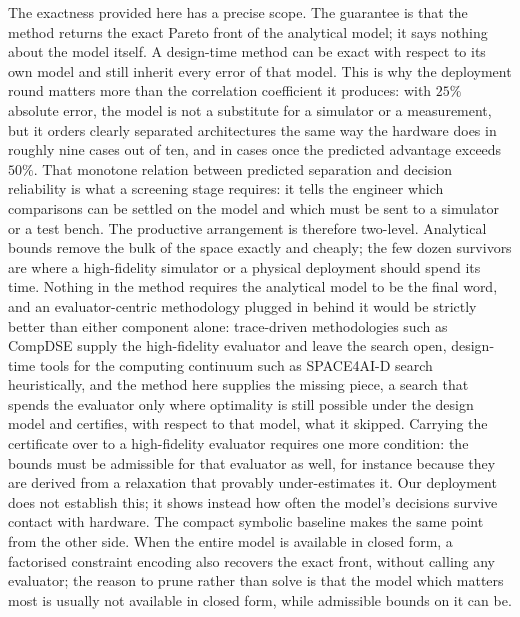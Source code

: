 The exactness provided here has a precise scope. The guarantee is that the method returns the exact Pareto front of the
analytical model; it says nothing about the model itself. A design-time method can be
exact with respect to its own model and still inherit every error of that model. This is
why the deployment round matters more than the correlation coefficient it produces: with
$25\%$ absolute error, the model is not a substitute for a simulator or a measurement,
but it orders clearly separated architectures the same way the hardware does in roughly
nine cases out of ten, and in \ReliabilityFifty{} cases once the predicted advantage exceeds
$50\%$. That monotone relation between predicted separation and decision reliability is
what a screening stage requires: it tells the engineer which comparisons can be settled on
the model and which must be sent to a simulator or a test bench. The productive
arrangement is therefore two-level. Analytical bounds remove the bulk of the space
exactly and cheaply; the few dozen survivors are where a high-fidelity simulator or a
physical deployment should spend its time. Nothing in the method requires the analytical
model to be the final word, and an evaluator-centric methodology plugged in behind it
would be strictly better than either component alone: trace-driven methodologies such as
CompDSE\cite{saadatmand2025compdse} supply the high-fidelity evaluator and leave the search
open, design-time tools for the computing continuum such as
SPACE4AI-D\cite{sedghani2024space4aid} search heuristically, and the method here supplies
the missing piece, a search that spends the evaluator only where optimality is still
possible under the design model and certifies, with respect to that model, what it
skipped. Carrying the certificate over to a high-fidelity evaluator requires one more
condition: the bounds must be admissible for that evaluator as well, for instance
because they are derived from a relaxation that provably under-estimates it. Our
deployment does not establish this; it shows instead how often the model's decisions
survive contact with hardware. The compact symbolic baseline makes the same point
from the other side. When the entire model is available in closed form, a factorised
constraint encoding also recovers the exact front, without calling any evaluator; the
reason to prune rather than solve is that the model which matters most is usually not
available in closed form, while admissible bounds on it can be.

